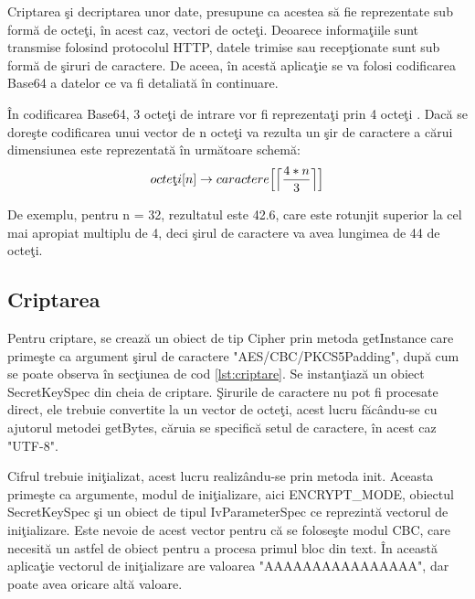 Criptarea \c{s}i decriptarea unor date, presupune ca acestea s\u{a} fie reprezentate sub form\u{a} de octe\c{t}i, \^{i}n acest caz, vectori de octe\c{t}i. Deoarece informa\c{t}iile sunt transmise folosind protocolul HTTP, datele trimise sau recep\c{t}ionate sunt sub form\u{a} de \c{s}iruri de caractere. De aceea, \^{i}n acest\u{a} aplica\c{t}ie se va folosi codificarea Base64 a datelor ce va fi detaliat\u{a} \^{i}n continuare\cite{base64}.

\^{I}n codificarea Base64, 3 octe\c{t}i de intrare vor fi reprezenta\c{t}i prin 4 octe\c{t}i \cite{base644to3}. Dac\u{a} se dore\c{s}te codificarea unui vector de n octe\c{t}i va rezulta un \c{s}ir de caractere a c\u{a}rui dimensiunea este reprezentat\u{a} \^{i}n urm\u{a}toare schem\u{a}: 
 \[ octe\text{\c{t}}i[n] \rightarrow caractere\Big[\ceil[\Big]{\frac{4 * n}{3}}\Big] \]
 
 De exemplu, pentru n = 32, rezultatul este 42.6, care este rotunjit superior la cel mai apropiat multiplu de 4, deci \c{s}irul de caractere va avea lungimea de 44 de octe\c{t}i.
\subsection{Criptarea}

Pentru criptare, se creaz\u{a} un obiect de tip Cipher prin metoda getInstance care prime\c{s}te ca argument \c{s}irul de caractere "AES/CBC/PKCS5Padding", dup\u{a} cum se poate observa \^{i}n sec\c{t}iunea de cod \ref{lst:criptare}. Se instan\c{t}iaz\u{a} un obiect SecretKeySpec din cheia de criptare. \c{S}irurile de caractere nu pot fi procesate direct, ele trebuie convertite la un vector de octe\c{t}i, acest lucru f\u{a}c\^{a}ndu-se cu ajutorul metodei getBytes, c\u{a}ruia se specific\u{a} setul de caractere, \^{i}n acest caz "UTF-8".

\lstset{caption=Cod folosit pentru criptare,label=lst:criptare}


Cifrul trebuie ini\c{t}ializat, acest lucru realiz\^{a}ndu-se prin metoda init. Aceasta prime\c{s}te ca argumente, modul de ini\c{t}ializare, aici ENCRYPT_MODE, obiectul SecretKeySpec \c{s}i un obiect de tipul IvParameterSpec ce reprezint\u{a} vectorul de ini\c{t}ializare. Este nevoie de acest vector pentru c\u{a} se folose\c{s}te modul CBC, care necesit\u{a} un astfel de obiect pentru a procesa primul bloc din text. \^{I}n aceast\u{a} aplica\c{t}ie vectorul de ini\c{t}ializare are valoarea "AAAAAAAAAAAAAAAA", dar poate avea oricare alt\u{a} valoare.

